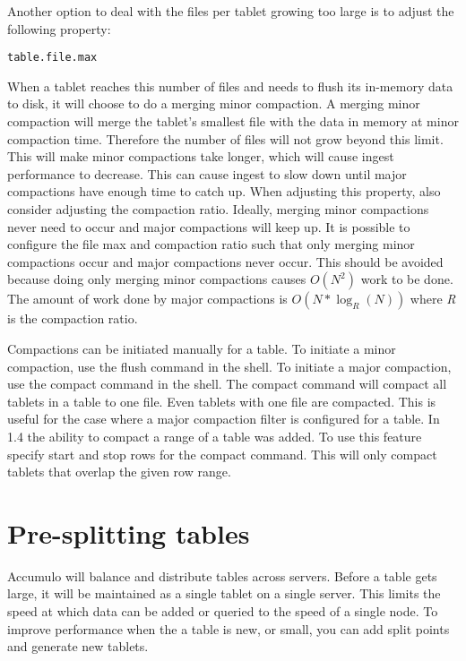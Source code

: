Another option to deal with the files per tablet growing too large is to adjust
the following property:

\begingroup\fontsize{8pt}{8pt}\selectfont\begin{verbatim}
table.file.max  
\end{verbatim}\endgroup

When a tablet reaches this number of files and needs to flush its in-memory
data to disk, it will choose to do a merging minor compaction. A merging minor
compaction will merge the tablet's smallest file with the data in memory at
minor compaction time. Therefore the number of files will not grow beyond this
limit. This will make minor compactions take longer, which will cause ingest
performance to decrease. This can cause ingest to slow down until major
compactions have enough time to catch up. When adjusting this property, also
consider adjusting the compaction ratio. Ideally, merging minor compactions
never need to occur and major compactions will keep up. It is possible to
configure the file max and compaction ratio such that only merging minor
compactions occur and major compactions never occur. This should be avoided
because doing only merging minor compactions causes $O(N^2)$ work to be done.
The amount of work done by major compactions is $O(N*\log_R(N))$ where
\textit{R} is the compaction ratio.

Compactions can be initiated manually for a table. To initiate a minor
compaction, use the flush command in the shell. To initiate a major compaction,
use the compact command in the shell. The compact command will compact all
tablets in a table to one file. Even tablets with one file are compacted. This
is useful for the case where a major compaction filter is configured for a
table. In 1.4 the ability to compact a range of a table was added. To use this
feature specify start and stop rows for the compact command. This will only
compact tablets that overlap the given row range.

\section{Pre-splitting tables}

Accumulo will balance and distribute tables across servers. Before a
table gets large, it will be maintained as a single tablet on a single
server. This limits the speed at which data can be added or queried
to the speed of a single node. To improve performance when the a table
is new, or small, you can add split points and generate new tablets.

